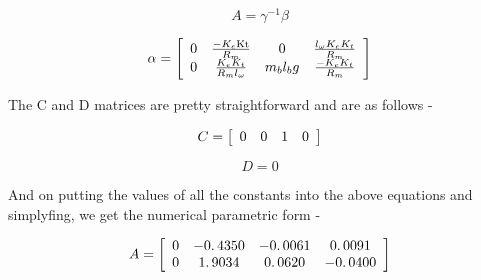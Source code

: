 \documentclass[11pt]{article}
\begin{document}
\begin{par}
$$A=\gamma^{-1} \beta$$
\end{par}

\begin{par}
$$\alpha =\left\lbrack \begin{array}{cccc}\linebreak 
0 & \frac{-K_e \mathrm{Kt}}{R_m } & 0 & \frac{l_{\omega } K_e K_t }{R_m }\\\linebreak 
0 & \frac{K_e K_t }{R_m l_{\omega } } & m_b l_b g & \frac{-K_e K_t }{R_m }\linebreak 
\end{array}\right\rbrack$$
\end{par}

\begin{par}
\begin{flushleft}
The C and D matrices are pretty straightforward and are as follows - 
\end{flushleft}
\end{par}

\begin{par}
$$C=\left\lbrack \begin{array}{cccc}\linebreak 
0 & 0 & 1 & 0\linebreak 
\end{array}\right\rbrack$$
\end{par}

\begin{par}
$$D=0$$
\end{par}

\begin{par}
\begin{flushleft}
And on putting the values of all the constants into the above equations and simplyfing, we get the numerical parametric form - 
\end{flushleft}
\end{par}

\begin{par}
$$A=\left\lbrack \begin{array}{cccc}\linebreak 
0 & -0\ldotp 4350 & -0\ldotp 0061 & 0\ldotp 0091\\\linebreak 
0 & 1\ldotp 9034 & 0\ldotp 0620 & -0\ldotp 0400\linebreak 
\end{array}\right\rbrack$$
\end{par}
\end{document}
